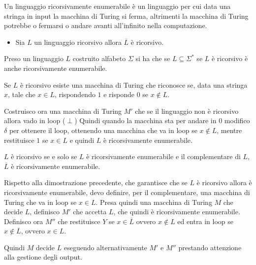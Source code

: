 Un linguaggio ricorsivamente enumerabile è un linguaggio per cui data una stringa 
in input la macchina di Turing si ferma, altrimenti la macchina di Turing potrebbe
 o fermarsi o andare avanti all'infinito nella computazione.

\begin{itemize}
    \item Sia $L$ un linguaggio ricorsivo allora $\overline{L}$ è ricorsivo.
\end{itemize}

\begin{teorema}
    Preso un linguaggio $L$ costruito alfabeto $\Sigma$ si ha che se 
    $L \subseteq \Sigma^{\ast}$ se $L$ è ricorsivo è anche ricorsivamente enumerabile.
\end{teorema}
\begin{dimostrazione}
    Se $L$ è ricorsivo esiste una macchina di Turing che riconosce se, data una 
    stringa $x$, tale che $x \in L$, rispondendo $1$ e risponde $0$ se $x \notin L$. 
    
    Costruisco ora una macchina di Turing $M'$ che se il linguaggio non è ricorsivo 
    allora vado in loop ($\perp$) Quindi quando la macchina sta per andare in $0$ 
    modifico $\delta$ per ottenere il loop, ottenendo una macchina che va in loop 
    se $x \notin L$, mentre restituisce $1$ se $x \in L$ e quindi $L$ è ricorsivamente enumerabile.
\end{dimostrazione}

\begin{teorema}
    $L$ è ricorsivo se e solo se $L$ è ricorsivamente enumerabile e il complementare 
    di $L$, $\overline{L}$ è ricorsivamente enumerabile.
\end{teorema}
\begin{dimostrazione}
    Rispetto alla dimostrazione precedente, che garantisce che se $L$ è ricorsivo 
    allora è ricorsivamente enumerabile, devo definire, per il complementare, 
    una macchina di Turing che va in loop se $x \in L$.
    Presa quindi una macchina di Turing $M$ che decide $L$, definisco $M'$ che 
    accetta $L$, che quindi è ricorsivamente enumerabile. Definisco ora $M''$ che 
    restituisce $Y$ se $x \in \overline{L}$ ovvero $x \notin L$ ed entra in loop 
    se $x \notin \overline{L}$, ovvero $x \in L$.
    
    Quindi $M$ decide $L$ eseguendo alternativamente $M'$ e $M''$ prestando 
    attenzione alla gestione degli output.
\end{dimostrazione}

